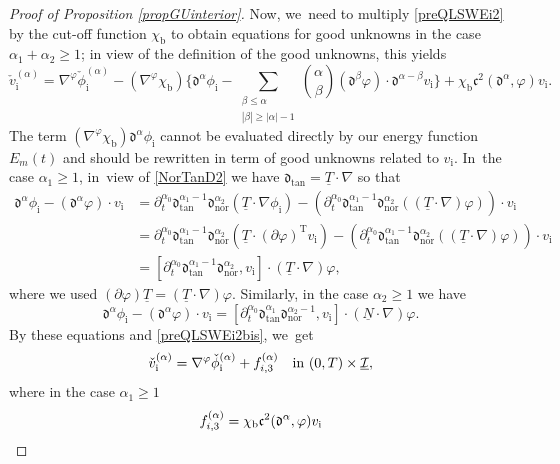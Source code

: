 \documentclass[11pt]{article}
\newcommand{\dtan}{{\mathfrak d}_\mathrm{tan}}
\newcommand{\dnor}{{\mathfrak d}_\mathrm{nor}}
\newcommand{\dt}{\partial_t}
\newcommand{\cI}{{\mathcal I}}
\newcommand{\ul}[1]{\underline{#1}}
\theoremstyle{definition}
\begin{document}
\begin{proof}[Proof of Proposition \ref{propGUinterior}]
Now, we~need to multiply \eqref{preQLSWEi2} by the cut-off function $\chi_\mathrm{b}$ to obtain equations for good unknowns in the case $\alpha_1+\alpha_2\geq1$;
in view of the definition of the good unknowns, this yields
\begin{equation}\label{preQLSWEi2bis}
\check{v}_\mathrm{i}^{(\alpha)}=\nabla^\varphi \check\phi_\mathrm{i}^{(\alpha)}-(\nabla^\varphi \chi_\mathrm{b})
\biggl\{ \mathfrak{d}^{\alpha}\phi_\mathrm{i}
- \sum_{\substack{\beta\leq\alpha\\ |\beta|\geq|\alpha|-1}} \binom{\alpha}{\beta}
(\mathfrak{d}^{\beta}\varphi)\cdot\mathfrak{d}^{\alpha-\beta}v_\mathrm{i} \biggr\} + \chi_\mathrm{b}{\mathfrak c}^2(\mathfrak{d}^\alpha,\varphi)v_\mathrm{i}.
\end{equation}
The term $(\nabla^\varphi\chi_\mathrm{b})\mathfrak{d}^{\alpha}\phi_\mathrm{i}$ cannot be evaluated directly by our energy
function $E_m(t)$ and should be rewritten in term of good unknowns related to $v_\mathrm{i}$. In~the case $\alpha_1\geq1$, in~view of \eqref{NorTanD2} we have $\dtan=\ul{T}\cdot\nabla$ so that
\begin{align*}
\mathfrak{d}^{\alpha}\phi_\mathrm{i} - (\mathfrak{d}^{\alpha}\varphi)\cdot v_\mathrm{i}
&= \dt^{\alpha_0}\dtan^{\alpha_1-1}\dnor^{\alpha_2}(\ul{T}\cdot\nabla\phi_\mathrm{i})
- (\dt^{\alpha_0}\dtan^{\alpha_1-1}\dnor^{\alpha_2}((\ul{T}\cdot\nabla)\varphi))\cdot v_\mathrm{i} \\
&= \dt^{\alpha_0}\dtan^{\alpha_1-1}\dnor^{\alpha_2}(\ul{T}\cdot(\partial\varphi)^\mathrm{T}v_\mathrm{i})
- (\dt^{\alpha_0}\dtan^{\alpha_1-1}\dnor^{\alpha_2}((\ul{T}\cdot\nabla)\varphi))\cdot v_\mathrm{i} \nonumber \\
&= [\dt^{\alpha_0}\dtan^{\alpha_1-1}\dnor^{\alpha_2},v_\mathrm{i}]\cdot(\ul{T}\cdot\nabla)\varphi, \nonumber
\end{align*}
where we used $(\partial\varphi)\ul{T}=(\ul{T}\cdot\nabla)\varphi$.
Similarly, in the case $\alpha_2\geq1$ we have
\[
\mathfrak{d}^{\alpha}\phi_\mathrm{i} - (\mathfrak{d}^{\alpha}\varphi)\cdot v_\mathrm{i}
= [\dt^{\alpha_0}\dtan^{\alpha_1}\dnor^{\alpha_2-1},v_\mathrm{i}]\cdot(\ul{N}\cdot\nabla)\varphi.
\]
By these equations and \eqref{preQLSWEi2bis}, we~get
\[
\check{v}_\mathrm{i}^{(\alpha)} = \nabla^\varphi\check{\phi}_\mathrm{i}^{(\alpha)} + f_{{\rm i},3}^{(\alpha)} \quad\text{in } (0,T)\times\ul{\cI},
\]
where in the case $\alpha_1\geq1$
\begin{multline}\label{deffi3}
f_{{\rm i},3}^{(\alpha)}
= \chi_\mathrm{b} \mathfrak{c}^2(\mathfrak{d}^\alpha,\varphi)v_\mathrm{i} \\

\end{multline}
\end{proof}
\end{document}
